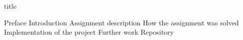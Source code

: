 \documentclass{article}
\begin{document}
{title}

\frontmatter

\tableofcontents

\mainmatter

{Preface}
{Introduction}
{Assignment description}
{How the assignment was solved}
{Implementation of the project}
{Further work}
{Repository}


\newpage




        


\renewcommand{\thesubsection}{\Alph{subsection}}




\end{document}
